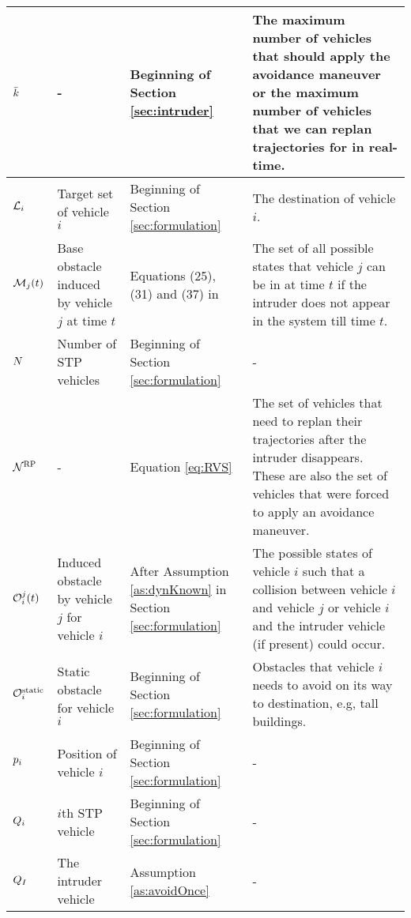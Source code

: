 \begin{table*}
{\begin{tabular}{ |>{\centering\arraybackslash}m{1.2cm}| m{5.2cm} | m{2.8cm} | m{0.3cm + \columnwidth} |}
    $\bar{k}$ & - & Beginning of Section \ref{sec:intruder} & The maximum number of vehicles that should apply the avoidance maneuver or the maximum number of vehicles that we can replan trajectories for in real-time.    \\ \hline    
    
    $\mathcal{L}_i$ & Target set of vehicle $i$ & Beginning of Section \ref{sec:formulation} & The destination of vehicle $i$.    \\ \hline
    
    $\mathcal{M}_j(t)$ & Base obstacle induced by vehicle $j$ at time $t$ & Equations (25), (31) and (37) in \cite{Chen2016d} & The set of all possible states that vehicle $j$ can be in at time $t$ if the intruder does not appear in the system till time $t$. \\ \hline    
    
    $N$ & Number of STP vehicles & Beginning of Section \ref{sec:formulation} & -    \\ \hline
    $\mathcal{N}^\text{RP}$ & - & Equation \eqref{eq:RVS} & The set of vehicles that need to replan their trajectories after the intruder disappears. These are also the set of vehicles that were forced to apply an avoidance maneuver. \\ \hline
    
    
	$\mathcal{O}_i^j(t)$ & Induced obstacle by vehicle $j$ for vehicle $i$ & After Assumption \ref{as:dynKnown} in Section \ref{sec:formulation} & The possible states of vehicle $i$ such that a collision between vehicle $i$ and vehicle $j$ or vehicle $i$ and the intruder vehicle (if present) could occur.    \\ \hline 
    $\mathcal{O}^\text{static}_i$ & Static obstacle for vehicle $i$ & Beginning of Section \ref{sec:formulation} & Obstacles that vehicle $i$ needs to avoid on its way to destination, e.g, tall buildings. \\ \hline    
    
    $p_i$ & Position of vehicle $i$ & Beginning of Section \ref{sec:formulation} & -    \\ \hline
     
    $Q_{i}$ & $i$th STP vehicle & Beginning of Section \ref{sec:formulation} & -  \\ \hline
    $Q_{I}$ & The intruder vehicle & Assumption \ref{as:avoidOnce} & -  \\ \hline
    

\end{tabular}}
\end{table*}
